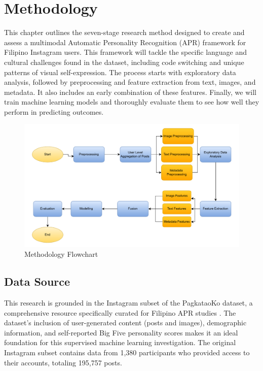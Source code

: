 \chapter{Methodology}
\label{sec:methodology}

This chapter outlines the seven-stage research method designed to create and assess a multimodal Automatic Personality Recognition (APR) framework for Filipino Instagram users. This framework will tackle the specific language and cultural challenges found in the dataset, including code switching and unique patterns of visual self-expression. The process starts with exploratory data analysis, followed by preprocessing and feature extraction from text, images, and metadata. It also includes an early combination of these features. Finally, we will train machine learning models and thoroughly evaluate them to see how well they perform in predicting outcomes.

\begin{figure}[H]
	\centering
	\includegraphics[width=\textwidth]{"figures/Methodology-Flowchart.pdf"}
	\caption{Methodology Flowchart}
	\label{fig:methodology_pipeline}
\end{figure}

\section{Data Source}
\label{sec:data}
This research is grounded in the Instagram subset of the PagkataoKo dataset, a comprehensive resource specifically curated for Filipino APR studies \citep{tighe_acorda_2022}. The dataset's inclusion of user-generated content (posts and images), demographic information, and self-reported Big Five personality scores makes it an ideal foundation for this supervised machine learning investigation. The original Instagram subset contains data from 1,380 participants who provided access to their accounts, totaling 195,757 posts.

